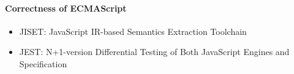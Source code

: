 \paragraph{Correctness of ECMAScript}
\begin{itemize}
  \item JISET: JavaScript IR-based Semantics Extraction Toolchain~\cite{jiset}
  \item JEST: N+1-version Differential Testing of Both JavaScript Engines
    and Specification~\cite{jest}
\end{itemize}


